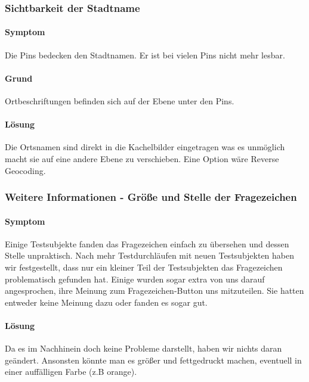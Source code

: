 \subsubsection{Sichtbarkeit der Stadtname}
\paragraph{Symptom}
Die Pins bedecken den Stadtnamen. Er ist bei vielen Pins nicht mehr lesbar.

\paragraph{Grund}
Ortbeschriftungen befinden sich auf der Ebene unter den Pins. 

\paragraph{Lösung}
Die Ortsnamen sind direkt in die Kachelbilder eingetragen was es unmöglich macht sie 
auf eine andere Ebene zu verschieben. Eine Option wäre Reverse Geocoding.

\subsubsection{Weitere Informationen - Größe und Stelle der Fragezeichen}

\paragraph{Symptom}
Einige Testsubjekte fanden das Fragezeichen einfach zu übersehen und dessen Stelle unpraktisch. Nach mehr Testdurchläufen mit neuen Testsubjekten haben wir festgestellt, dass nur ein kleiner Teil der Testsubjekten das Fragezeichen problematisch gefunden hat. Einige wurden sogar extra von uns darauf angesprochen, ihre Meinung zum Fragezeichen-Button uns mitzuteilen. Sie hatten entweder keine Meinung dazu oder fanden es sogar gut.

\paragraph{Lösung}
Da es im Nachhinein doch keine Probleme darstellt, haben wir nichts daran geändert. Ansonsten könnte man es größer und fettgedruckt machen, eventuell in einer auffälligen Farbe (z.B orange).
